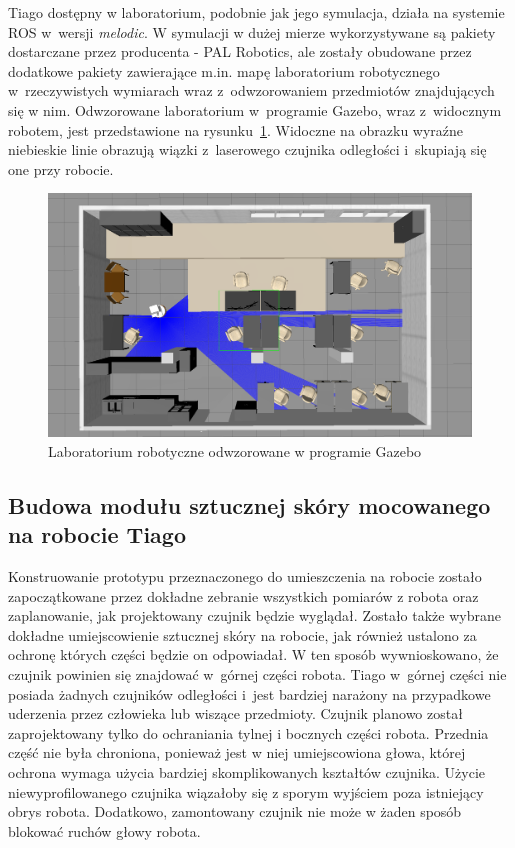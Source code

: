 Tiago dostępny w laboratorium, podobnie jak jego symulacja, działa na systemie ROS w~wersji \textit{melodic}. W symulacji w dużej mierze wykorzystywane są pakiety dostarczane przez producenta - PAL Robotics, ale zostały obudowane przez dodatkowe pakiety zawierające m.in. mapę laboratorium robotycznego w~rzeczywistych wymiarach wraz z~odwzorowaniem przedmiotów znajdujących się w nim. Odwzorowane laboratorium w~programie Gazebo, wraz z~widocznym robotem, jest przedstawione na rysunku~\ref{f_lab_gazebo}. Widoczne na obrazku wyraźne niebieskie linie obrazują wiązki z~laserowego czujnika odległości i~skupiają się one przy robocie. 

\begin{figure}[!h]
    \centering 
    \includegraphics[width=0.95\linewidth]{img/ros_gazebo_lab.png}
    \caption{Laboratorium robotyczne odwzorowane w programie Gazebo}
    \label{f_lab_gazebo}
\end{figure}

\subsection{Budowa modułu sztucznej skóry mocowanego na robocie Tiago}
\label{ss_integracja_budowa}

Konstruowanie prototypu przeznaczonego do umieszczenia na robocie zostało zapoczątkowane przez dokładne zebranie wszystkich pomiarów z robota oraz zaplanowanie, jak projektowany czujnik będzie wyglądał. Zostało także wybrane dokładne umiejscowienie sztucznej skóry na robocie, jak również ustalono za ochronę których części będzie on odpowiadał. W ten sposób wywnioskowano, że czujnik powinien się znajdować w~górnej części robota. Tiago w~górnej części nie posiada żadnych czujników odległości i~jest bardziej narażony na przypadkowe uderzenia przez człowieka lub wiszące przedmioty. Czujnik planowo został zaprojektowany tylko do ochraniania tylnej i bocznych części robota. Przednia część nie była chroniona, ponieważ jest w niej umiejscowiona głowa, której ochrona wymaga użycia bardziej skomplikowanych kształtów czujnika. Użycie niewyprofilowanego czujnika wiązałoby się z sporym wyjściem poza istniejący obrys robota. Dodatkowo, zamontowany czujnik nie może w żaden sposób blokować ruchów głowy robota.

